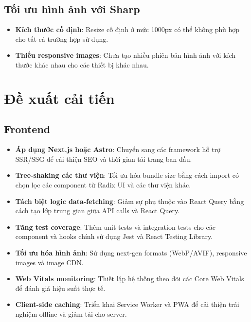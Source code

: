 \subsection{Tối ưu hình ảnh với Sharp}
\begin{itemize}
    \item \textbf{Kích thước cố định}: Resize cố định ở mức 1000px có thể không phù hợp cho tất cả trường hợp sử dụng.
    \item \textbf{Thiếu responsive images}: Chưa tạo nhiều phiên bản hình ảnh với kích thước khác nhau cho các thiết bị khác nhau.
\end{itemize}

\section{Đề xuất cải tiến}

\subsection{Frontend}
\begin{itemize}
    \item \textbf{Áp dụng Next.js hoặc Astro}: Chuyển sang các framework hỗ trợ SSR/SSG để cải thiện SEO và thời gian tải trang ban đầu.
    \item \textbf{Tree-shaking các thư viện}: Tối ưu hóa bundle size bằng cách import có chọn lọc các component từ Radix UI và các thư viện khác.
    \item \textbf{Tách biệt logic data-fetching}: Giảm sự phụ thuộc vào React Query bằng cách tạo lớp trung gian giữa API calls và React Query.
    \item \textbf{Tăng test coverage}: Thêm unit tests và integration tests cho các component và hooks chính sử dụng Jest và React Testing Library.
    \item \textbf{Tối ưu hóa hình ảnh}: Sử dụng next-gen formats (WebP/AVIF), responsive images và image CDN.
    \item \textbf{Web Vitals monitoring}: Thiết lập hệ thống theo dõi các Core Web Vitals để đánh giá hiệu suất thực tế.
    \item \textbf{Client-side caching}: Triển khai Service Worker và PWA để cải thiện trải nghiệm offline và giảm tải cho server.
\end{itemize}

